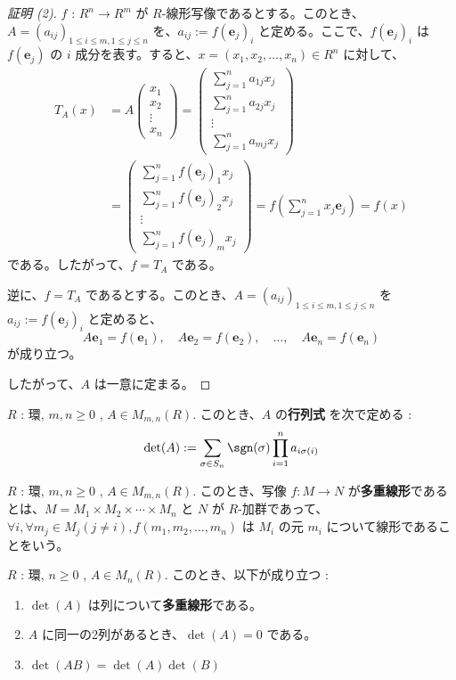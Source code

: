 \documentclass[article,paper=a4paper]{jlreq}
\begin{document}
\begin{proof}[証明 (2)]
  $f$ : $R^n \to R^m$ が $R$-\hspace{0pt}線形写像であるとする。このとき、$A = (a_{ij})_{1 \leq i \leq m, 1 \leq j \leq n}$ を、$a_{ij} := f(\mathbf{e}_j)_i$ と定める。ここで、$f(\mathbf{e}_j)_i$ は $f(\mathbf{e}_j)$ の $i$ 成分を表す。すると、$x = (x_1, x_2, \ldots, x_n) \in R^n$ に対して、
  \begin{align*}
    T_A(x) &= A\begin{pmatrix}x_1 \\ x_2 \\ \vdots \\ x_n\end{pmatrix} = \begin{pmatrix}\sum_{j=1}^n a_{1j}x_j \\ \sum_{j=1}^n a_{2j}x_j \\ \vdots \\ \sum_{j=1}^n a_{mj}x_j\end{pmatrix}\\
    &= \begin{pmatrix}\sum_{j=1}^n f(\mathbf{e}_j)_1 x_j \\ \sum_{j=1}^n f(\mathbf{e}_j)_2 x_j \\ \vdots \\ \sum_{j=1}^n f(\mathbf{e}_j)_m x_j\end{pmatrix} = f\left(\sum_{j=1}^n x_j\mathbf{e}_j\right) = f(x)
  \end{align*}
  である。したがって、$f = T_A$ である。

  逆に、$f = T_A$ であるとする。このとき、$A = (a_{ij})_{1 \leq i \leq m, 1 \leq j \leq n}$ を $a_{ij} := f(\mathbf{e}_j)_i$ と定めると、
  \[A\mathbf{e}_1 = f(\mathbf{e}_1), \quad A\mathbf{e}_2 = f(\mathbf{e}_2), \quad \ldots, \quad A\mathbf{e}_n = f(\mathbf{e}_n)\]
  が成り立つ。
  
  したがって、$A$ は一意に定まる。
\end{proof}

\begin{dfn}
  \quad $R$ : 環, $m, n \geq 0$ , $A \in M_{m, n}(R)$.
  このとき、$A$ の\textbf{行列式} を次で定める :
\[\det(A) := \sum_{\sigma \in S_n} \sgn(\sigma) \prod_{i=1}^n a_{i\sigma(i)}\]
\end{dfn}

\begin{dfn}
  \quad $R$ : 環, $m, n \geq 0$ , $A \in M_{m, n}(R)$.
  このとき、写像 $f : M \to N$ が\textbf{多重線形}であるとは、$M = M_1 \times M_2 \times \cdots \times M_n$ と $N$ が $R$-加群であって、$\forall i, \forall m_j \in M_j (j \neq i), f(m_1, m_2, \ldots, m_n)$ は $M_i$ の元 $m_i$ について線形であることをいう。
  
\end{dfn}

\begin{prop}
  \quad $R$ : 環, $n \geq 0$ , $A \in M_n(R)$.
  このとき、以下が成り立つ :
\begin{enumerate}[label=(\arabic*)\,]
  \item $\det(A)$ は列について\textbf{多重線形}である。
  \item $A$ に同一の2列があるとき、$\det(A) = 0$ である。
  \item $\det(AB) = \det(A)\det(B)$
  \end{enumerate}
\end{prop}
\end{document}
